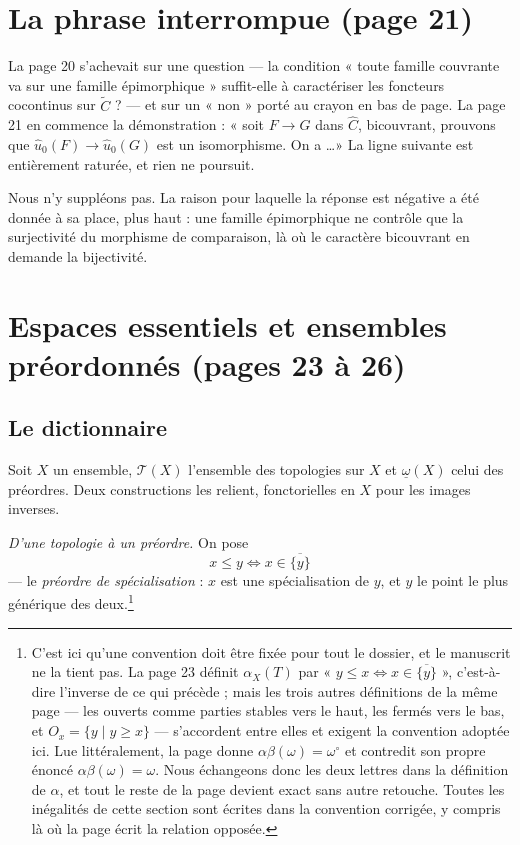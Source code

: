 \documentclass[11pt,a4paper]{article}
\begin{document}
\section*{La phrase interrompue (page 21)}

La page 20 s'achevait sur une question — la condition « toute famille
couvrante va sur une famille épimorphique » suffit-elle à caractériser les
foncteurs cocontinus sur $\widetilde{C}$ ? — et sur un « non » porté au crayon
en bas de page. La page 21 en commence la démonstration : « soit
$F \to G$ dans $\widehat{C}$, bicouvrant, prouvons que
$\widehat{u}_{0}(F) \to \widehat{u}_{0}(G)$ est un isomorphisme. On a \ldots »
La ligne suivante est entièrement raturée, et rien ne poursuit.

Nous n'y suppléons pas. La raison pour laquelle la réponse est négative a été
donnée à sa place, plus haut : une famille épimorphique ne contrôle que la
surjectivité du morphisme de comparaison, là où le caractère bicouvrant en
demande la bijectivité.


\section*{Espaces essentiels et ensembles préordonnés (pages 23 à 26)}

\subsection*{Le dictionnaire}

Soit $X$ un ensemble, $\mathcal{T}(X)$ l'ensemble des topologies sur $X$ et
$\underline{\omega}(X)$ celui des préordres. Deux constructions les relient,
fonctorielles en $X$ pour les images inverses.

\emph{D'une topologie à un préordre.} On pose
\[
x \leq y \iff x \in \overline{\{y\}}
\]
— le \emph{préordre de spécialisation} : $x$ est une spécialisation de $y$, et
$y$ le point le plus générique des deux.\footnote{C'est ici qu'une convention
doit être fixée pour tout le dossier, et le manuscrit ne la tient pas. La page
23 définit $\alpha_{X}(T)$ par « $y \leq x \iff x \in \overline{\{y\}}$ »,
c'est-à-dire l'inverse de ce qui précède ; mais les trois autres définitions de
la même page — les ouverts comme parties stables vers le haut, les fermés vers
le bas, et $O_{x} = \{y \mid y \geq x\}$ — s'accordent entre elles et exigent
la convention adoptée ici. Lue littéralement, la page donne
$\alpha\beta(\omega) = \omega^{\circ}$ et contredit son propre énoncé
$\alpha\beta(\omega) = \omega$. Nous échangeons donc les deux lettres dans la
définition de $\alpha$, et tout le reste de la page devient exact sans autre
retouche. Toutes les inégalités de cette section sont écrites dans la
convention corrigée, y compris là où la page écrit la relation opposée.}
\end{document}
